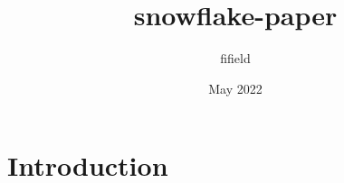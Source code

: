 \documentclass{article}
\title{snowflake-paper}
\author{fifield }
\date{May 2022}
\begin{document}
\maketitle

\section{Introduction}
\end{document}
